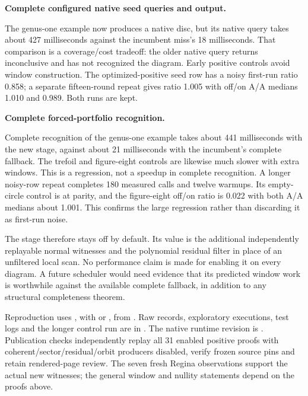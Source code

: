 \begin{samepage}
\noindent\textbf{Complete configured native seed queries and output.}

\end{samepage}

The genus-one example now produces a native disc, but its native query takes
about 427 milliseconds against the incumbent miss's 18 milliseconds.
That comparison is a coverage/cost tradeoff: the older native query returns
inconclusive and has not recognized the diagram. Early positive controls
avoid window construction. The optimized-positive seed row has a noisy
first-run ratio 0.858; a separate fifteen-round repeat gives ratio 1.005
with off/on A/A medians 1.010 and 0.989. Both runs are kept.

\begin{samepage}
\noindent\textbf{Complete forced-portfolio recognition.}

\end{samepage}

Complete recognition of the genus-one example takes about 441 milliseconds
with the new stage, against about 21 milliseconds with the incumbent's
complete fallback. The trefoil and figure-eight controls are likewise much
slower with extra windows. This is a regression, not a speedup in complete
recognition. A longer noisy-row repeat completes 180 measured calls and
twelve warmups. Its empty-circle control is at parity, and the figure-eight
off/on ratio is 0.022 with both A/A medians about 1.001. This confirms the
large regression rather than discarding it as first-run noise.

The stage therefore stays off by default. Its value is the additional
independently replayable normal witnesses and the polynomial residual filter
in place of an unfiltered local scan. No performance claim is made for
enabling it on every diagram. A future scheduler would need evidence that
its predicted window work is worthwhile against the available complete
fallback, in addition to any structural completeness theorem.

\begin{sloppypar}
Reproduction uses , with
 or , from .
Raw records, exploratory executions, test logs and the longer control run
are in . The native runtime revision is
. Publication checks independently replay all 31 enabled
positive proofs with coherent/sector/residual/orbit producers disabled,
verify frozen source pins and retain rendered-page review. The seven fresh
Regina observations support the actual new witnesses; the general window
and nullity statements depend on the proofs above.
\end{sloppypar}
